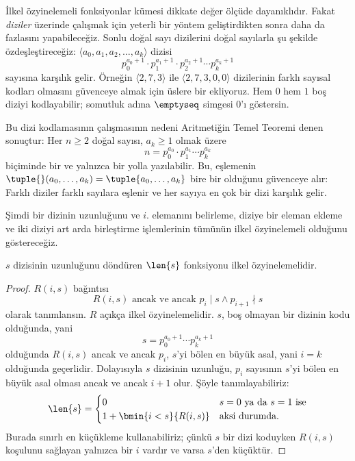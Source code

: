 \documentclass[../../../include/open-logic-section]{subfiles}
\begin{document}

İlkel özyinelemeli fonksiyonlar kümesi dikkate değer ölçüde dayanıklıdır.
Fakat \emph{diziler} üzerinde çalışmak için yeterli bir yöntem geliştirdikten
sonra daha da fazlasını yapabileceğiz. Sonlu doğal sayı dizilerini doğal
sayılarla şu şekilde özdeşleştireceğiz: $\langle a_0,a_1,a_2,\dots,a_k\rangle$
dizisi
\[
  p_0^{a_0+1}\cdot p_1^{a_1+1}\cdot p_2^{a_2+1}\cdots p_k^{a_k+1}
\]
sayısına karşılık gelir. Örneğin $\langle2,7,3\rangle$ ile
$\langle2,7,3,0,0\rangle$ dizilerinin farklı sayısal kodları olmasını
güvenceye almak için üslere bir ekliyoruz. Hem $0$ hem $1$ boş diziyi
kodlayabilir; somutluk adına $\emptyseq$ simgesi $0$'ı göstersin.

Bu dizi kodlamasının çalışmasının nedeni Aritmetiğin Temel Teoremi denen
sonuçtur: Her $n\geq2$ doğal sayısı, $a_k\geq1$ olmak üzere
\[
  n=p_0^{a_0}\cdot p_1^{a_1}\cdots p_k^{a_k}
\]
biçiminde bir ve yalnızca bir yolla yazılabilir. Bu, eşlemenin
$\tuple{}(a_0,\dots,a_k)=\tuple{a_0,\dots,a_k}$ bire bir olduğunu güvenceye
alır: Farklı diziler farklı sayılara eşlenir ve her sayıya en çok bir dizi
karşılık gelir.

Şimdi bir dizinin uzunluğunu ve $i$. elemanını belirleme, diziye bir eleman
ekleme ve iki diziyi art arda birleştirme işlemlerinin tümünün ilkel
özyinelemeli olduğunu göstereceğiz.

\begin{prop}
  $s$ dizisinin uzunluğunu döndüren $\len{s}$ fonksiyonu ilkel
  özyinelemelidir.
\end{prop}

\begin{proof}
  $R(i,s)$ bağıntısı
  \[
    R(i,s) \text{ ancak ve ancak } p_i\mid s\land p_{i+1}\nmid s
  \]
  olarak tanımlansın. $R$ açıkça ilkel özyinelemelidir. $s$, boş olmayan
  bir dizinin kodu olduğunda, yani
  \[
    s=p_0^{a_0+1}\cdots p_k^{a_k+1}
  \]
  olduğunda $R(i,s)$ ancak ve ancak $p_i$, $s$'yi bölen en büyük asal,
  yani $i=k$ olduğunda geçerlidir. Dolayısıyla $s$ dizisinin uzunluğu,
  $p_i$ sayısının $s$'yi bölen en büyük asal olması ancak ve ancak $i+1$
  olur. Şöyle tanımlayabiliriz:
  \[
    \len{s}=\begin{cases}
      0 & \text{$s=0$ ya da $s=1$ ise}\\
      1+\bmin{i<s}{R(i,s)} & \text{aksi durumda.}
    \end{cases}
  \]
  Burada sınırlı en küçükleme kullanabiliriz; çünkü $s$ bir dizi koduyken
  $R(i,s)$ koşulunu sağlayan yalnızca bir $i$ vardır ve varsa $s$'den
  küçüktür.
\end{proof}
\end{document}
